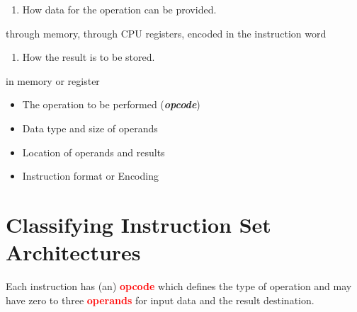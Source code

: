 \documentclass[
  14pt,
  a4paper,
  DIV=11,
  numbers=noendperiod,
  headinclude=true,
  footinclude=true]{scrreprt}
\providecommand{\tightlist}{%
  \setlength{\itemsep}{0pt}\setlength{\parskip}{0pt}}\usepackage{longtable,booktabs,array}
\begin{document}
\begin{enumerate}
\def\labelenumi{\arabic{enumi}.}
\setcounter{enumi}{1}
\tightlist
\item
  How data for the operation can be provided.
\end{enumerate}

\begin{tcolorbox}[colback=boxbodycol, colframe=boxbodycol]
through memory, through CPU registers, encoded in the instruction word

\end{tcolorbox}

\begin{enumerate}
\def\labelenumi{\arabic{enumi}.}
\setcounter{enumi}{2}
\tightlist
\item
  How the result is to be stored.
\end{enumerate}

\begin{tcolorbox}[colback=boxbodycol, colframe=boxbodycol]
in memory or register

\end{tcolorbox}

\begin{tcolorbox}[colback=boxbodycol, colframe=boxheadcol, title=\textcolor{red}{\textbf{Therefore, the ISA must define:}}, coltitle=boxtitlecol, colbacktitle=boxheadcol]

\begin{itemize}
\tightlist
\item
  The operation to be performed (\textbf{\emph{opcode}})
\item
  Data type and size of operands
\item
  Location of operands and results
\item
  Instruction format or Encoding
\end{itemize}

\end{tcolorbox}

\newpage{}

\section{Classifying Instruction Set
Architectures}\label{classifying-instruction-set-architectures}

Each instruction has (an) \textcolor{red}{\textbf{opcode}} which defines
the type of operation and may have zero to three
\textcolor{red}{\textbf{operands}} for input data and the result
destination.
\end{document}
